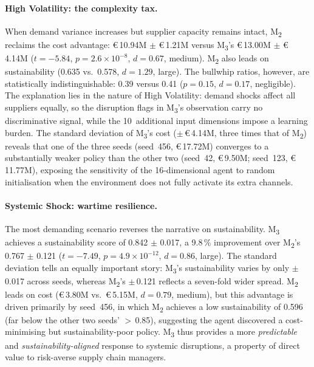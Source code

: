 \documentclass[preprint,12pt]{elsarticle}
\begin{document}
\paragraph{High Volatility: the complexity tax.}
When demand variance increases but supplier capacity remains intact, M\textsubscript{2} reclaims the cost advantage: \euro\,10.94M $\pm$ \euro\,1.21M versus M\textsubscript{3}'s \euro\,13.00M $\pm$ \euro\,4.14M ($t = -5.84$, $p = 2.6\!\times\!10^{-8}$, $d = 0.67$, medium).
M\textsubscript{2} also leads on sustainability (0.635 vs.\ 0.578, $d = 1.29$, large).
The bullwhip ratios, however, are statistically indistinguishable: 0.39 versus 0.41 ($p = 0.15$, $d = 0.17$, negligible).
The explanation lies in the nature of High Volatility: demand shocks affect all suppliers equally, so the disruption flags in M\textsubscript{3}'s observation carry no discriminative signal, while the 10~additional input dimensions impose a learning burden.
The standard deviation of M\textsubscript{3}'s cost ($\pm$\,\euro\,4.14M, three times that of M\textsubscript{2}) reveals that one of the three seeds (seed~456, \euro\,17.72M) converges to a substantially weaker policy than the other two (seed~42, \euro\,9.50M; seed~123, \euro\,11.77M), exposing the sensitivity of the 16-dimensional agent to random initialisation when the environment does not fully activate its extra channels.

\paragraph{Systemic Shock: wartime resilience.}
The most demanding scenario reverses the narrative on sustainability.
M\textsubscript{3} achieves a sustainability score of 0.842 $\pm$ 0.017, a 9.8\,\% improvement over M\textsubscript{2}'s 0.767 $\pm$ 0.121 ($t = -7.49$, $p = 4.9\!\times\!10^{-12}$, $d = 0.86$, large).
The standard deviation tells an equally important story: M\textsubscript{3}'s sustainability varies by only $\pm$\,0.017 across seeds, whereas M\textsubscript{2}'s $\pm$\,0.121 reflects a seven-fold wider spread.
M\textsubscript{2} leads on cost (\euro\,3.80M vs.\ \euro\,5.15M, $d = 0.79$, medium), but this advantage is driven primarily by seed~456, in which M\textsubscript{2} achieves a low sustainability of 0.596 (far below the other two seeds' $>$\,0.85), suggesting the agent discovered a cost-minimising but sustainability-poor policy.
M\textsubscript{3} thus provides a more \emph{predictable} and \emph{sustainability-aligned} response to systemic disruptions, a property of direct value to risk-averse supply chain managers.
\end{document}
